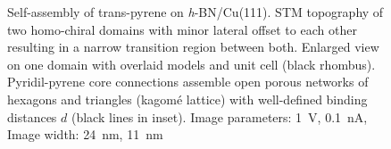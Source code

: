 \begin{figure}[] \centering
	\caption{Self-assembly of trans-pyrene on \textit{h}-BN/Cu(111).  STM topography of two homo-chiral domains with minor lateral offset to each other resulting in a narrow transition region between both.  Enlarged view on one domain with overlaid models and unit cell (black rhombus). Pyridil-pyrene core connections assemble open porous networks of hexagons and triangles (kagom\'e lattice) with well-defined binding distances $d$ (black lines in inset). Image parameters: \SI{1}{\volt}, \SI{0.1}{\nano \ampere}, Image width:  \SI{24}{\nano \meter},  \SI{11}{\nano \meter}}
	\label{fig:pyrene-fig5}
\end{figure}

